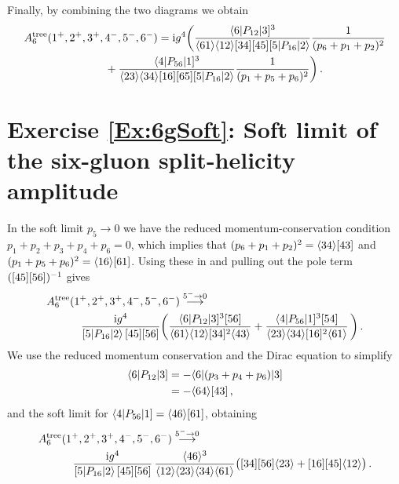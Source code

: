 Finally, by combining the two diagrams we obtain
\begin{align} \begin{aligned}
A_{6}^{\text{tree}}(1^{+},2^{+},3^{+}, {} & 4^{-},5^{-},6^{-}) = \mathrm{i} g^4 \biggl( \frac{\langle 6 | P_{12} | 3 ]^3}{\langle 6 1 \rangle \langle 1 2 \rangle [ 3 4 ] [ 4 5 ] [ 5 | P_{16} | 2 \rangle} \frac{1}{(p_6+p_1+p_2)^2} \\
& + \frac{\langle 4 | P_{56} | 1 ]^3}{ \langle23\rangle \langle34\rangle [16][65] [ 5 | P_{16} | 2 \rangle }  \frac{1}{(p_1+p_5+p_6)^2} \biggr) \,.
\end{aligned} \end{align}


\section*{Exercise \ref{Ex:6gSoft}: Soft limit of the six-gluon split-helicity amplitude}
\label{Sol:6gSoft}
%
In the soft limit $p_5 \to 0$ we have the reduced momentum-conservation condition $p_{1}+p_{2}+p_{3}+p_{4}+p_{6}=0$, which implies that $(p_6+p_1+p_2)^2 = \langle 3 4 \rangle [ 4 3 ]$ and $(p_1+p_5+p_6)^2 = \langle 1 6 \rangle [ 6 1 ]$. Using these in  and pulling out the pole term $([45][56])^{-1}$ gives
%
\begin{align} 
\begin{aligned}
A_{6}^{\text{tree}}&(1^{+}, 2^{+}, 3^{+}, 4^{-}, 5^{-}, 6^{-}) \stackrel{5^- \to 0}{\longrightarrow}
\\ & \quad 
\frac{\mathrm{i} g^4}{[5|P_{16}|2\rangle\, [45][56]} \biggl(
\frac{\langle 6|P_{12}|3]^{3} [56]}{\langle61\rangle\langle12\rangle[34]^2 \langle43\rangle}
+ \frac{ \langle 4|P_{56}|1]^{3} [54] }{\langle23\rangle\langle34\rangle [16]^2 \langle61\rangle}\,
\biggr) \,.
\end{aligned} 
\end{align}
%
We use the reduced momentum conservation and the Dirac equation to simplify
\begin{align}
\langle 6|P_{12}|3] & = - \langle 6|(p_3+p_4+p_6)|3] \nonumber \\
& = - \langle 6 4 \rangle [ 4 3 ]\,,
\end{align}
and the soft limit for $\langle 4|P_{56}|1] = \langle 4 6 \rangle [ 6 1 ]$, obtaining
%
\begin{align} 
\begin{aligned}
A_{6}^{\text{tree}}&(1^{+}, 2^{+}, 3^{+}, 4^{-}, 5^{-}, 6^{-}) \stackrel{5^- \to 0}{\longrightarrow}
\\ & \quad 
 \frac{\mathrm{i} g^4}{[5|P_{16}|2\rangle\, [45][56]}\, \frac{\langle46\rangle^{3}}{\langle12\rangle\langle23\rangle\langle34\rangle
\langle61\rangle} \bigl([34][56] \langle23\rangle +  [16][45]\langle12\rangle \bigr) \,.
\end{aligned} 
\end{align}
